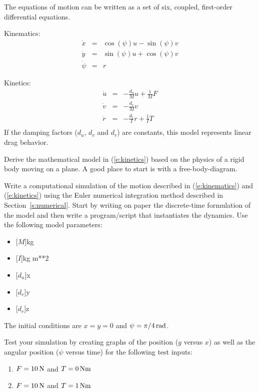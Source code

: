 The equations of motion can be written as  a set of six, coupled, first-order differential equations.

\noindent
Kinematics:
\begin{eqnarray}\label{e:direct_kinematics}
\dot{x} & = & \cos{(\psi)}u - \sin{(\psi)}v \\
\dot{y} & = & \sin{(\psi)}u + \cos{(\psi)}v \\
\dot{\psi} & = & r
\end{eqnarray}

\noindent
Kinetics:
\begin{eqnarray}\label{e:direct_kinetics}
\dot{u} & = & -\frac{d_u}{M}u + \frac{1}{M}F \\
\dot{v} & = & -\frac{d_v}{M}v \\
\dot{r} & = & -\frac{d_r}{I}r + \frac{1}{I}T \\
\end{eqnarray}
If the damping factors ($d_u$, $d_v$ and $d_r$) are constants, this model represents linear drag behavior.

\begin{ex}
Derive the mathematical model in (\ref{e:kinetics}) based on the physics of a rigid body moving on a plane.  A good place to start is with a free-body-diagram.
\end{ex}

\begin{ex}
Write a computational simulation of the motion described in (\ref{e:kinematics}) and (\ref{e:kinetics}) using the Euler numerical integration method described in Section~\ref{s:numerical}.  Start by writing on paper the discrete-time formulation of the model and then write a program/script that instantiates the dynamics.  Use the following model parameters:
\begin{itemize}
\item \unit[$M$]{kg}
\item \unit[$I$]{kg m**2}
\item \unit[$d_u$]{x}
\item \unit[$d_v$]{y}
\item \unit[$d_r$]{z}
\end{itemize}

\noindent
The initial conditions are $x=y=0$ and $\psi = \unit[\pi/4]{rad}$.  

\noindent
Test your simulation by creating graphs of the position ($y$ versus $x$) as well as the angular position ($\psi$ versus time) for the following test inputs:
\begin{enumerate}
\item $F = \unit[10]{N}$ and $T = \unit[0]{Nm}$
\item $F = \unit[10]{N}$ and $T = \unit[1]{Nm}$
\end{enumerate}
\end{ex}

